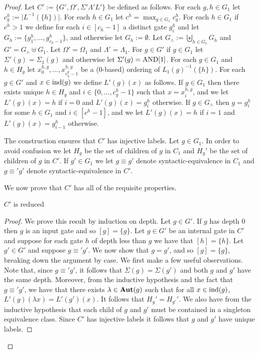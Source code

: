 \documentclass[../paper.tex]{subfiles}
\begin{document}
\begin{proof}
  Let $C' := \{G', \Omega', \Sigma' \Lambda' L'\}$ be defined as follows. For
  each $g, h \in G_1$ let $c^h_g := \vert L^{-1}(\{h\}) \vert$. For each $h \in
  G_1$ let $c^h = \max_{g \in G_1} c^h_g$. For each $h \in G_1$ if $c^h > 1$ we
  define for each $i \in [c_h-1]$ a distinct gate $g^h_i$ and let $G_h :=
  \{g^{h}_{1}, \ldots, g^h_{c_h-1}\}$, and otherwise let $G_h := \emptyset$. Let
  $G_{\land} := \biguplus_{h \in G_1} G_h$ and $G' = G_{\land} \uplus G_1$. Let
  $\Omega' = \Omega_1$ and $\Lambda' = \Lambda_1$. For $g \in G'$ if $g \in G_1$
  let $\Sigma'(g) = \Sigma_1(g)$ and otherwise let $\Sigma'(g) = \text{\upshape AND}[1]$. For
  each $g \in G_1$ and $h \in H_g$ let $x^{h,g}_0, \ldots, x^{h,g}_{c^g_h - 1}$
  be a ($0$-based) ordering of $L_1(g)^{-1}(\{h\})$. For each $g \in G'$ and $x
  \in \text{\upshape ind}(g)$ we define $L'(g)(x)$ as follows. If $g \in G_1$ then there exists
  unique $h \in H_g$ and $i \in \{0, \ldots, c^h_g - 1\}$ such that $x =
  x^{h,g}_i$, and we let $L'(g)(x) = h$ if $i = 0$ and $L'(g) (x) = g^h_i$
  otherwise. If $g \in G_{\land}$ then $g = g^h_i$ for some $h \in G_1$ and $i
  \in [c^h-1]$, and we let $L'(g)(x) = h$ if $i = 1$ and $L'(g)(x) = g^h_{i-1}$
  otherwise.

  The construction ensures that $C'$ has injective labels. Let $g \in G_1$. In
  order to avoid confusion we let $H_g$ be the set of children of $g$ in $C_1$
  and $H_g'$ be the set of children of $g$ in $C'$. If $g' \in G_1$ we let $g
  \equiv g'$ denote syntactic-equivalence in $C_1$ and $g \equiv' g'$ denote
  syntactic-equivalence in $C'$.

  We now prove that $C'$ has all of the requisite properties.
  
  \begin{claim}
    $C'$ is reduced
  \end{claim}
  \begin{proof}
    We prove this result by induction on depth. Let $g \in G'$. If $g$ has depth
    $0$ then $g$ is an input gate and so $[g] = \{g\}$. Let $g \in G'$ be an
    internal gate in $C'$ and suppose for each gate $h$ of depth less than $g$
    we have that $[h] = \{ h \}$. Let $g' \in G'$ and suppose $g \equiv' g'$. We
    now show that $g = g'$, and so $[g] = \{g\}$, breaking down the argument by
    case. We first make a few useful observations. Note that, since $g \equiv'
    g'$, it follows that $\Sigma (g) = \Sigma(g')$ and both $g$ and $g'$ have
    the same depth. Moreover, from the inductive hypothesis and the fact that $g
    \equiv' g'$, we have that there exists $\lambda \in \text{\textbf{Aut}}(g)$ such that for
    all $x \in \text{\upshape ind}(g)$, $L'(g) (\lambda x) = L'(g')(x)$. It follows that
    $H_{g}' = H_{g'}'$. We also have from the inductive hypothesis that each
    child of $g$ and $g'$ must be contained in a singleton equivalence class.
    Since $C'$ has injective labels it follows that $g$ and $g'$ have unique
    labels.


\end{proof}
\end{proof}
\end{document}
